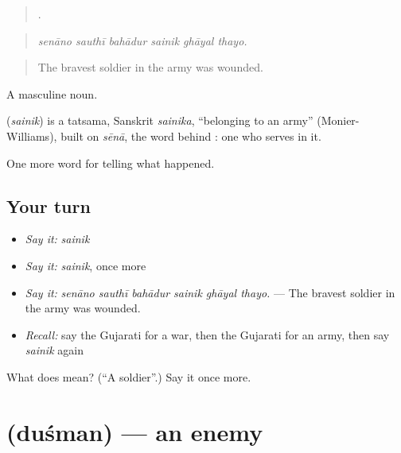 \begin{quote}
     .
\end{quote}

\begin{quote}
\emph{senāno sauthī bahādur sainik ghāyal thayo.}
\end{quote}

\begin{quote}
The bravest soldier in the army was wounded.
\end{quote}

A masculine noun.

\begin{cousinweb}
\textbf{} (\emph{sainik}) is a tatsama, Sanskrit \emph{sainika}, \textquotedblleft{}belonging to an army\textquotedblright{} (Monier-Williams), built on \emph{sēnā}, the word behind \textbf{}: one who serves in it.
\end{cousinweb}

\begin{grammarlens}[title={What you've built}]
One more word for telling what happened.
\end{grammarlens}

\subsection*{Your turn}
\begin{itemize}
\raggedright
  \item \emph{Say it:} \emph{sainik}
  \item \emph{Say it:} \emph{sainik}, once more
  \item \emph{Say it:} \emph{senāno sauthī bahādur sainik ghāyal thayo.} — The bravest soldier in the army was wounded.
  \item \emph{Recall:} say the Gujarati for a war, then the Gujarati for an army, then say \emph{sainik} again
\end{itemize}

\begin{tcolorbox}[breakable,colback=teal!4,colframe=teal!35!black,title={Before you move on}]
What does  mean? (\textquotedblleft{}A soldier\textquotedblright{}.) Say it once more.
\end{tcolorbox}
\section[\texorpdfstring{\gu{દુશ્મન} (duśman)}{દુશ્મન (duśman)}]{ (duśman) — an enemy}

